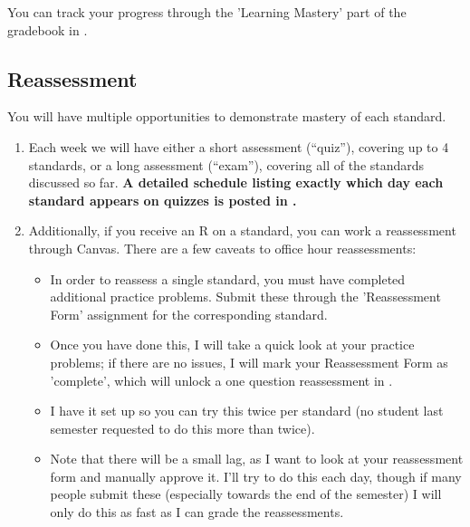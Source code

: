 \documentclass{article}
\begin{document}
You can track your progress through the 'Learning Mastery' part of the gradebook in \LMS. 

    \subsection*{\fontsize{10}{12}\selectfont Reassessment}
    You will have multiple opportunities to demonstrate mastery of each standard.  
    \begin{enumerate}[1)]
    \item Each week we will have either a short assessment (``quiz''), covering  up to 4 standards, or a long assessment (``exam''), covering all of the standards discussed so far.  {\bf A detailed schedule listing exactly which day each standard appears on quizzes is posted in \LMS.}
    \item Additionally, if you receive an R on a standard, you can work a reassessment through Canvas.  There are a few caveats to office hour reassessments:
    \begin{itemize}
    \item In order to reassess a single standard, you must have completed additional practice problems. Submit these through the 'Reassessment Form' assignment for the corresponding standard.
    \item Once you have done this, I will take a quick look at your practice problems; if there are no issues, I will mark your Reassessment Form as 'complete', which will unlock a one question reassessment in \LMS.
    \item I have it set up so you can try this twice per standard (no student last semester requested to do this more than twice).
    \item Note that there will be a small lag, as I want to look at your reassessment form and manually approve it. I'll try to do this each day, though if many people submit these (especially towards the end of the semester) I will only do this as fast as I can grade the reassessments.
\end{itemize}
    \end{enumerate}
\end{document}
